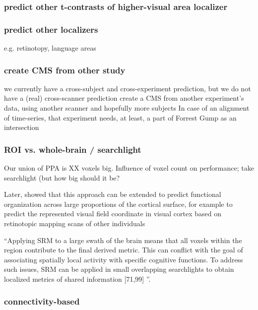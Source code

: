 \subsubsection{predict other t-contrasts of higher-visual area localizer}

\subsubsection{predict other localizers}
%
e.g. retinotopy, language areas


\subsubsection{create CMS from other study}
%
we currently have a cross-subject and cross-experiment prediction,
but we do not have a (real) cross-scanner prediction
%
create a CMS from another experiment’s data,
using another scanner and hopefully more subjects
%
In case of an alignment of time-series,
that experiment needs, at least, a part of Forrest Gump as an intersection


\subsubsection{ROI vs. whole-brain / searchlight}
%
Our union of PPA is XX voxels big.
%
Influence of voxel count on performance; take searchlight (but how big should it
be?

Later, \citet{guntupalli2016model} showed that this approach can be extended to
predict functional organization across large proportions of the cortical
surface, for example to predict the represented visual field coordinate in
visual cortex based on retinotopic mapping scans of other individuals

``Applying SRM to a large swath of the brain means that all voxels within the
region contribute to the final derived metric. This can conflict with the goal
of associating spatially local activity with specific cognitive functions. To
address such issues, SRM can be applied in small overlapping searchlights to
obtain localized metrics of shared information [71,99]
\citep{cohen2017computational}''.


\subsubsection{connectivity-based}


